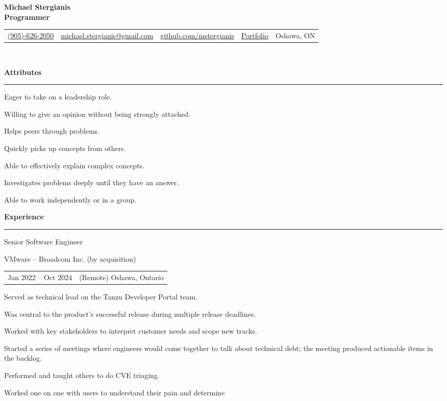 \documentclass[letterpaper]{article}
\makeatletter
\newcommand{\primary}{\color{primary}}
\newcommand{\primarydark}{\color{primarydark}}
\newcommand{\complementary}{\color{complementary}}
\newcommand{\mapMarker}{\faMapMarker*[alt]}
\newcommand{\email}
{\faEnvelope \space \href{mailto:michaelstergianis@gmail.com}{michael.stergianis@gmail.com}}
\newcommand{\github}
{\faGithub \space \href{https://github.com/mstergianis}{github.com/mstergianis}}
\newcommand{\phone}
{\faPhone \space \href{tel:+1-905-626-2050}{(905)-626-2050}}
\newcommand{\portfolio}
{\faBriefcase \space \href{https://michael.stergianis.ca}{Portfolio}}
\newcommand{\location}
{\mapMarker \space Oshawa, ON}
\newenvironment{heading}[1]{%
  {\LARGE \primarydark \textbf{#1}}\\ {\complementary
    \rule[5pt]{\linewidth}{0.6pt}}
}
{\par\vspace{8pt}}
\newcommand{\blockend}{\vspace{4pt}}
\newenvironment{experience}[4]{
  { #1 \par}
  {\small \primary #2 \par}
  \begin{tabularx}{\linewidth}{ l l }
    { \small \faCalendar \space #3 } & { \small \mapMarker \space #4 }
  \end{tabularx}%
}{
  \blockend{}
}
\newenvironment{itemize*}%
{\begin{itemize}[topsep=0pt,leftmargin=20pt]%
    \setlength{\itemsep}{0pt}%
    \setlength{\parsep}{0pt}%
    \setlength{\parskip}{0pt}%
    \small%
  }%
  {\end{itemize}}
\makeatother
\begin{document}
{\huge \textbf{Michael Stergianis}}\\
{\large \primary \textbf{Programmer}}
\\

\begingroup
\hypersetup{
  urlcolor=.,
}
\begin{tabularx}{\linewidth}{ l l l l l }
  \phone & \email & \github & \portfolio & \location \\
\end{tabularx}\\
\endgroup

\begin{minipage}[t]{0.59\textwidth}%
  \begin{heading}{Attributes}
    \begin{itemize*}
    \item Eager to take on a leadership role.
    \item Willing to give an opinion without being strongly attached.
    \item Helps peers through problems.
    \item Quickly picks up concepts from others.
    \item Able to effectively explain complex concepts.
    \item Investigates problems deeply until they have an answer.
    \item Able to work independently or in a group.
    \end{itemize*}
  \end{heading}
  \begin{heading}{Experience}%
    \begin{experience}{Senior Software Engineer}
      {VMware -- Broadcom Inc. (by acquisition)}
      {Jan 2022 -- Oct 2024}
      {(Remote) Oshawa, Ontario}
      Served as technical lead on the Tanzu Developer Portal team.
      \begin{itemize*}
      \item Was central to the product's successful release during multiple
        release deadlines.
      \item Worked with key stakeholders to interpret customer needs and scope
        new tracks.
      \item Started a series of meetings where engineers would come together to
        talk about technical debt; the meeting produced actionable items in the
        backlog.
      \item Performed and taught others to do CVE triaging.
      \item Worked one on one with users to understand their pain and determine

\end{itemize*}
\end{experience}
\end{heading}
\end{minipage}
\end{document}

